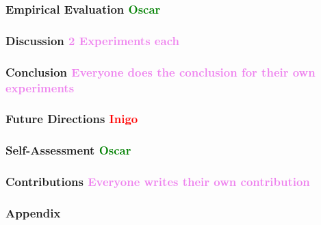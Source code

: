 \documentclass[12pt, letterpaper]{article}
\begin{document}
\subsubsection*{Empirical Evaluation \textcolor{green}{Oscar}}

\subsubsection*{Discussion \textcolor{violet}{2 Experiments each}}



\subsubsection*{Conclusion \textcolor{violet}{Everyone does the conclusion for their own experiments}}

\subsubsection*{Future Directions \textcolor{red}{Inigo}}

\subsubsection*{Self-Assessment \textcolor{green}{Oscar}}

\subsubsection*{Contributions \textcolor{violet}{Everyone writes their own contribution}}





\pagebreak
\subsubsection*{Appendix}
\cite{Ahmed} %
\printbibliography
\end{document}
